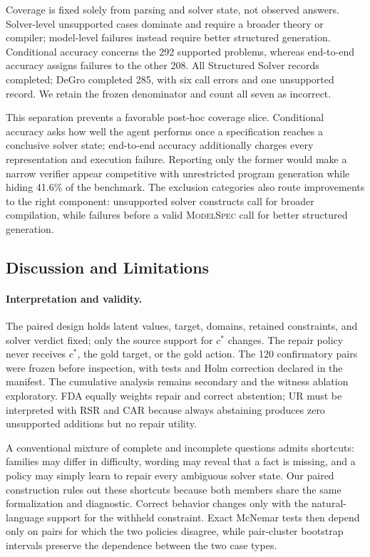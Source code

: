 \documentclass[sigconf,anonymous]{aamas}
\begin{document}
Coverage is fixed solely from parsing and solver state, not observed answers.  Solver-level unsupported cases dominate and require a broader theory or compiler; model-level failures instead require better structured generation.  Conditional accuracy concerns the 292 supported problems, whereas end-to-end accuracy assigns failures to the other 208.  All Structured Solver records completed; DeGro completed 285, with six call errors and one unsupported record.  We retain the frozen denominator and count all seven as incorrect.

This separation prevents a favorable post-hoc coverage slice.  Conditional accuracy asks how well the agent performs once a specification reaches a conclusive solver state; end-to-end accuracy additionally charges every representation and execution failure.  Reporting only the former would make a narrow verifier appear competitive with unrestricted program generation while hiding 41.6\% of the benchmark.  The exclusion categories also route improvements to the right component: unsupported solver constructs call for broader compilation, while failures before a valid \textsc{ModelSpec} call for better structured generation.

\subsection{Discussion and Limitations}
\paragraph{Interpretation and validity.}
The paired design holds latent values, target, domains, retained constraints, and solver verdict fixed; only the source support for $c^*$ changes.  The repair policy never receives $c^*$, the gold target, or the gold action.  The 120 confirmatory pairs were frozen before inspection, with tests and Holm correction declared in the manifest.  The cumulative analysis remains secondary and the witness ablation exploratory.  FDA equally weights repair and correct abstention; UR must be interpreted with RSR and CAR because always abstaining produces zero unsupported additions but no repair utility.

A conventional mixture of complete and incomplete questions admits shortcuts: families may differ in difficulty, wording may reveal that a fact is missing, and a policy may simply learn to repair every ambiguous solver state.  Our paired construction rules out these shortcuts because both members share the same formalization and diagnostic.  Correct behavior changes only with the natural-language support for the withheld constraint.  Exact McNemar tests then depend only on pairs for which the two policies disagree, while pair-cluster bootstrap intervals preserve the dependence between the two case types.
\end{document}
